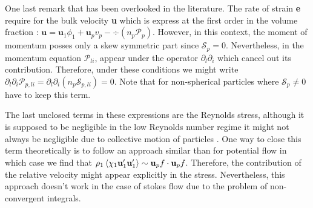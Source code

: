 One last remark that has been overlooked in the literature. 
The rate of strain \textbf{e} require for the bulk velocity \textbf{u} which is express at the first order in the volume fraction : $\textbf{u} = \textbf{u}_1 \phi_1 + \textbf{u}_pv_p - \div(n_p \mathcal{P}_p)$.
However, in this context, the moment of momentum  posses only a skew symmetric part since $\mathcal{S}_p = 0$. 
Nevertheless, in the momentum equation $\mathcal{P}_{li}$, appear under the operator $\partial_l\partial_i$ which cancel out its contribution. 
Therefore, under these conditions we might write $\partial_l\partial_i \mathcal{P}_{p,li} = \partial_l\partial_i (n_p \mathcal{S}_{p,li}) = 0$. 
Note that for non-spherical particles where $\mathcal{S}_p \neq 0$ have to keep this term. 

The last unclosed terms in these expressions are the Reynolds stress, although it is supposed to be negligible in the low Reynolds number regime it might not always be negligible due to collective motion of particles \citet{zhang1997momentum}. 
One way to close this term theoretically is to follow an approach similar than \citet{van1982bubble} for potential flow in which case we find that $\rho_1\left<\chi_1\textbf{u}_1'\textbf{u}_1'\right> \sim \textbf{u}_pf\cdot \textbf{u}_pf$.
Therefore, the contribution of the relative velocity might appear explicitly in the stress. 
Nevertheless, this approach doesn't work in the case of stokes flow due to the problem of non-convergent integrals. 